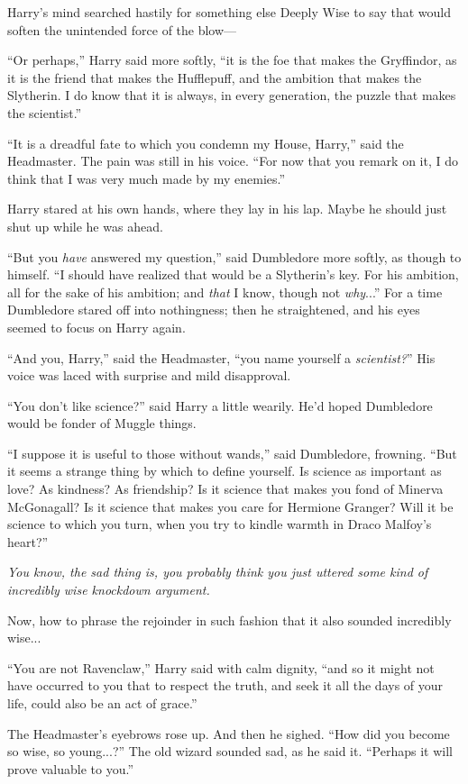 Harry’s mind searched hastily for something else Deeply Wise to say that would soften the unintended force of the blow—

“Or perhaps,” Harry said more softly, “it is the foe that makes the Gryffindor, as it is the friend that makes the Hufflepuff, and the ambition that makes the Slytherin. I do know that it is always, in every generation, the puzzle that makes the scientist.”

“It is a dreadful fate to which you condemn my House, Harry,” said the Headmaster. The pain was still in his voice. “For now that you remark on it, I do think that I was very much made by my enemies.”

Harry stared at his own hands, where they lay in his lap. Maybe he should just shut up while he was ahead.

“But you \emph{have} answered my question,” said Dumbledore more softly, as though to himself. “I should have realized that would be a Slytherin’s key. For his ambition, all for the sake of his ambition; and \emph{that} I know, though not \emph{why}...” For a time Dumbledore stared off into nothingness; then he straightened, and his eyes seemed to focus on Harry again.

“And you, Harry,” said the Headmaster, “you name yourself a \emph{scientist?}” His voice was laced with surprise and mild disapproval.

“You don’t like science?” said Harry a little wearily. He’d hoped Dumbledore would be fonder of Muggle things.

“I suppose it is useful to those without wands,” said Dumbledore, frowning. “But it seems a strange thing by which to define yourself. Is science as important as love? As kindness? As friendship? Is it science that makes you fond of Minerva McGonagall? Is it science that makes you care for Hermione Granger? Will it be science to which you turn, when you try to kindle warmth in Draco Malfoy’s heart?”

\emph{You know, the sad thing is, you probably think you just uttered some kind of incredibly wise knockdown argument.}

Now, how to phrase the rejoinder in such fashion that it also sounded incredibly wise...

“You are not Ravenclaw,” Harry said with calm dignity, “and so it might not have occurred to you that to respect the truth, and seek it all the days of your life, could also be an act of grace.”

The Headmaster’s eyebrows rose up. And then he sighed. “How did you become so wise, so young...?” The old wizard sounded sad, as he said it. “Perhaps it will prove valuable to you.”

